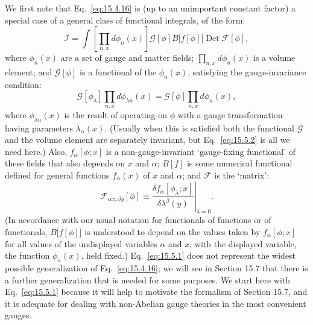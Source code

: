 We first note that Eq.~\eqref{eq:15.4.16} is (up to an unimportant constant
factor) a special case of a general class of functional integrals, of the form:
\begin{equation}
  \mathcal I=\int\left[\prod_{n,x}d\phi_n(x)\right]
  \mathcal G[\phi]B\bigl[f[\phi]\bigr]\operatorname{Det}\mathcal F[\phi],
  \tag{15.5.1}\label{eq:15.5.1}
\end{equation}
where $\phi_n(x)$ are a set of gauge and matter fields;
$\prod_{n,x}d\phi_n(x)$ is a volume element; and $\mathcal G[\phi]$ is a
functional of the $\phi_n(x)$, satisfying the gauge-invariance condition:
\begin{equation}
  \mathcal G[\phi_\lambda]\prod_{n,x}d\phi_{\lambda n}(x)
  =\mathcal G[\phi]\prod_{n,x}d\phi_n(x),
  \tag{15.5.2}\label{eq:15.5.2}
\end{equation}
where $\phi_{\lambda n}(x)$ is the result of operating on $\phi$ with a gauge
transformation having parameters $\lambda_\alpha(x)$. (Usually when this is
satisfied both the functional $\mathcal G$ and the volume element are
separately invariant, but Eq.~\eqref{eq:15.5.2} is all we need here.) Also,
$f_\alpha[\phi;x]$ is a non-gauge-invariant `gauge-fixing functional' of these
fields that also depends on $x$ and $\alpha$; $B[f]$ is some numerical
functional defined for general functions $f_\alpha(x)$ of $x$ and $\alpha$;
and $\mathcal F$ is the `matrix':
\begin{equation}
  \mathcal F_{\alpha x,\beta y}[\phi]
  \equiv\left.\frac{\delta f_\alpha[\phi_\lambda;x]}
  {\delta\lambda^\beta(y)}\right|_{\lambda=0}.
  \tag{15.5.3}\label{eq:15.5.3}
\end{equation}
(In accordance with our usual notation for functionals of functions or of
functionals, $B\bigl[f[\phi]\bigr]$ is understood to depend on the values taken
by $f_\alpha[\phi;x]$ for all values of the undisplayed variables $\alpha$ and
$x$, with the displayed variable, the function $\phi_n(x)$, held fixed.)
Eq.~\eqref{eq:15.5.1} does not represent the widest possible generalization of
Eq.~\eqref{eq:15.4.16}; we will see in Section 15.7 that there is a further
generalization that is needed for some purposes. We start here with
Eq.~\eqref{eq:15.5.1} because it will help to motivate the formalism of
Section 15.7, and it is adequate for dealing with non-Abelian gauge theories
in the most convenient gauges.

